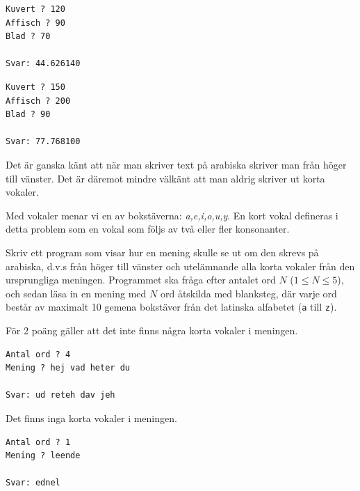 
\vspace{1cm}

\begin{verbatim}
Kuvert ? 120
Affisch ? 90
Blad ? 70

Svar: 44.626140
\end{verbatim}

\vspace{1cm}

\begin{verbatim}
Kuvert ? 150
Affisch ? 200
Blad ? 90

Svar: 77.768100
\end{verbatim}



\newpage
{}

Det är ganska känt att när man skriver text på arabiska skriver man från höger till vänster.
Det är däremot mindre välkänt att man aldrig skriver ut korta vokaler.

Med vokaler menar vi en av bokstäverna: \textit{a,e,i,o,u,y}.
En kort vokal defineras i detta problem som en vokal som följs av två eller fler konsonanter.

Skriv ett program som visar hur en mening skulle se ut om den skrevs på arabiska, d.v.s från höger till vänster och utelämnande alla korta vokaler från den ursprungliga meningen. Programmet ska fråga efter antalet ord $N$ ($1 \le N \le 5$), och sedan läsa in en mening med $N$ ord åtskilda med blanksteg, där varje ord består av maximalt 10 gemena bokstäver från det latinska alfabetet (\texttt{a} till \texttt{z}).


 För 2 poäng gäller att det inte finns några korta vokaler i meningen.

\vspace{1cm}



\begin{verbatim}
Antal ord ? 4
Mening ? hej vad heter du

Svar: ud reteh dav jeh
\end{verbatim}

 Det finns inga korta vokaler i meningen.

\vspace{1cm}

\begin{verbatim}
Antal ord ? 1
Mening ? leende

Svar: ednel
\end{verbatim}

